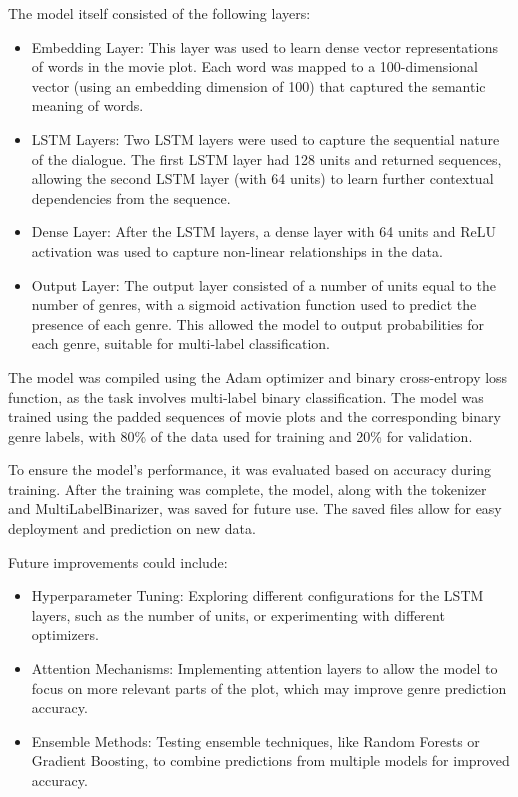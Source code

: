 \documentclass[conference]{IEEEtran}
\begin{document}
The model itself consisted of the following layers:
\begin{itemize}
    \item Embedding Layer: This layer was used to learn dense vector representations of words in the movie plot. Each word was mapped to a 100-dimensional vector (using an embedding dimension of 100) that captured the semantic meaning of words.
    \item LSTM Layers: Two LSTM layers were used to capture the sequential nature of the dialogue. The first LSTM layer had 128 units and returned sequences, allowing the second LSTM layer (with 64 units) to learn further contextual dependencies from the sequence.
    \item Dense Layer: After the LSTM layers, a dense layer with 64 units and ReLU activation was used to capture non-linear relationships in the data.
    \item Output Layer: The output layer consisted of a number of units equal to the number of genres, with a sigmoid activation function used to predict the presence of each genre. This allowed the model to output probabilities for each genre, suitable for multi-label classification.
\end{itemize}

The model was compiled using the Adam optimizer and binary cross-entropy loss function, as the task involves multi-label binary classification. The model was trained using the padded sequences of movie plots and the corresponding binary genre labels, with 80\% of the data used for training and 20\% for validation.

To ensure the model's performance, it was evaluated based on accuracy during training. After the training was complete, the model, along with the tokenizer and MultiLabelBinarizer, was saved for future use. The saved files allow for easy deployment and prediction on new data.

Future improvements could include:
\begin{itemize}
    \item Hyperparameter Tuning: Exploring different configurations for the LSTM layers, such as the number of units, or experimenting with different optimizers.
    \item Attention Mechanisms: Implementing attention layers to allow the model to focus on more relevant parts of the plot, which may improve genre prediction accuracy.
    \item Ensemble Methods: Testing ensemble techniques, like Random Forests or Gradient Boosting, to combine predictions from multiple models for improved accuracy.
\end{itemize}
\end{document}
